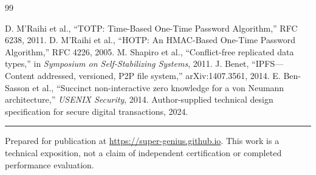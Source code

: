 \documentclass[10pt,letterpaper]{article}
\begin{document}
\vspace{6pt}
\begin{thebibliography}{99}

 D. M'Raihi et al., ``TOTP: Time-Based One-Time Password Algorithm,'' RFC 6238, 2011.
 D. M'Raihi et al., ``HOTP: An HMAC-Based One-Time Password Algorithm,'' RFC 4226, 2005.
 M. Shapiro et al., ``Conflict-free replicated data types,'' in \emph{Symposium on Self-Stabilizing Systems}, 2011.
 J. Benet, ``IPFS---Content addressed, versioned, P2P file system,'' arXiv:1407.3561, 2014.
 E. Ben-Sasson et al., ``Succinct non-interactive zero knowledge for a von Neumann architecture,'' \emph{USENIX Security}, 2014.
 Author-supplied technical design specification for secure digital transactions, 2024.

\end{thebibliography}
\vspace{6pt}
\noindent\rule{\textwidth}{0.3pt}
\noindent\footnotesize Prepared for publication at \url{https://super-genius.github.io}. This work is a technical exposition, not a claim of independent certification or completed performance evaluation.
\end{document}
